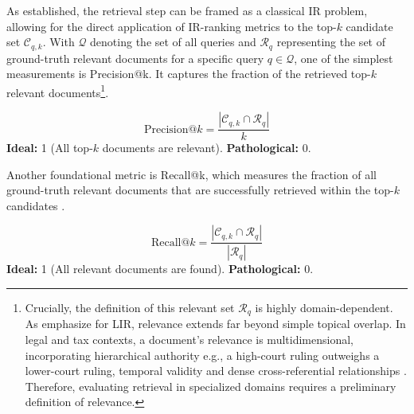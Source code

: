 As established, the retrieval step can be framed as a classical \ac{IR} problem, allowing for the direct application of \ac{IR}-ranking metrics to the top-$k$ candidate set $\mathcal{C}_{q,k}$. With $\mathcal{Q}$ denoting the set of all queries and $\mathcal{R}_q$ representing the set of ground-truth relevant documents for a specific query $q \in \mathcal{Q}$, one of the simplest measurements is Precision@k. It captures the fraction of the retrieved top-$k$ relevant documents\footnote{Crucially, the definition of this relevant set $\mathcal{R}_q$ is highly domain-dependent. As \citet{van_opijnen_concept_2017} emphasize for \ac{LIR}, relevance extends far beyond simple topical overlap. In legal and tax contexts, a document's relevance is multidimensional, incorporating hierarchical authority e.g., a high-court ruling outweighs a lower-court ruling, temporal validity and dense cross-referential relationships \cite{van_opijnen_concept_2017}. Therefore, evaluating retrieval in specialized domains requires a preliminary definition of relevance.}\citep[p. 155]{manning2008introduction}\cite{gan2025retrieval}.

\begin{metricbox}
\begin{equation}
    \text{Precision@}k = \frac{|\mathcal{C}_{q,k} \cap \mathcal{R}_q|}{k}
\end{equation}
\textbf{Ideal:} 1 (All top-$k$ documents are relevant). \quad \textbf{Pathological:} 0.
\end{metricbox}

Another foundational metric is Recall@k, which measures the fraction of all ground-truth relevant documents that are successfully retrieved within the top-$k$ candidates \citep[p. 155]{manning2008introduction}.

\begin{metricbox}

\begin{equation}
    \text{Recall@}k = \frac{|\mathcal{C}_{q,k} \cap \mathcal{R}_q|}{|\mathcal{R}_q|}
\end{equation}
\textbf{Ideal:} 1 (All relevant documents are found). \quad \textbf{Pathological:} 0.
\end{metricbox}

